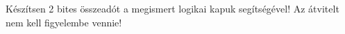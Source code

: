 \begin{example}

Készítsen 2 bites összeadót a megismert logikai kapuk segítségével! Az átvitelt nem kell figyelembe vennie!

\tcbline
\vspace{1mm}

\solution

\end{example}